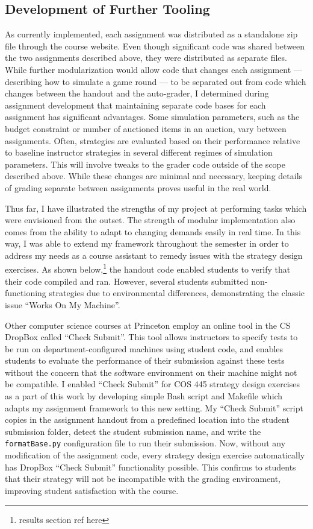 \documentclass[pageno]{jpaper}
\begin{document}
\subsection*{Development of Further Tooling}
As currently implemented, each assignment was distributed as a standalone zip file through the course website.
Even though significant code was shared between the two assignments described above, they were distributed as separate files.
While further modularization would allow code that changes each assignment --- describing how to simulate a game round --- to be separated out from code which changes between the handout and the auto-grader, I determined during assignment development that maintaining separate code bases for each assignment has significant advantages.
Some simulation parameters, such as the budget constraint or number of auctioned items in an auction, vary between assignments.
Often, strategies are evaluated based on their performance relative to baseline instructor strategies in several different regimes of simulation parameters.
This will involve tweaks to the grader code outside of the scope described above.
While these changes are minimal and necessary, keeping details of grading separate between assignments proves useful in the real world.

Thus far, I have illustrated the strengths of my project at performing tasks which were envisioned from the outset.
The strength of modular implementation also comes from the ability to adapt to changing demands easily in real time.
In this way, I was able to extend my framework throughout the semester in order to address my needs as a course assistant to remedy issues with the strategy design exercises.
As shown below,\footnote{results section ref here} the handout code enabled students to verify that their code compiled and ran.
However, several students submitted non-functioning strategies due to environmental differences, demonstrating the classic issue ``Works On My Machine''.

Other computer science courses at Princeton employ an online tool in the CS DropBox called ``Check Submit''.
This tool allows instructors to specify tests to be run on department-configured machines using student code, and enables students to evaluate the performance of their submission against these tests without the concern that the software environment on their machine might not be compatible.
I enabled ``Check Submit'' for COS 445 strategy design exercises as a part of this work by developing simple Bash script and Makefile which adapts my assignment framework to this new setting.
My ``Check Submit'' script copies in the assignment handout from a predefined location into the student submission folder, detect the student submission name, and write the \texttt{formatBase.py} configuration file to run their submission.
Now, without any modification of the assignment code, every strategy design exercise automatically has DropBox ``Check Submit'' functionality possible.
This confirms to students that their strategy will not be incompatible with the grading environment, improving student satisfaction with the course.
\end{document}
